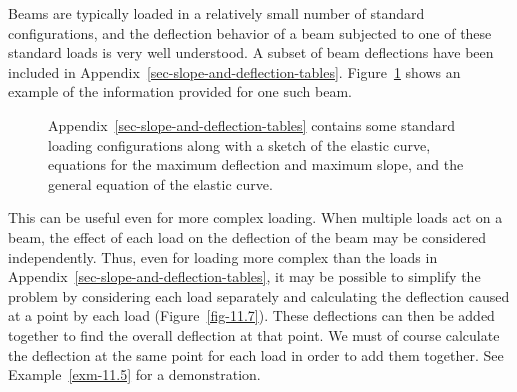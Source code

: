\documentclass[
  letterpaper,
  DIV=11,
  numbers=noendperiod]{scrreprt}
\theoremstyle{definition}
\theoremstyle{remark}
\begin{document}
Beams are typically loaded in a relatively small number of standard
configurations, and the deflection behavior of a beam subjected to one
of these standard loads is very well understood. A subset of beam
deflections have been included in
Appendix~\ref{sec-slope-and-deflection-tables}. Figure~\ref{fig-11.6}
shows an example of the information provided for one such beam.

\begin{figure}


\caption{\label{fig-11.6}Appendix~\ref{sec-slope-and-deflection-tables}
contains some standard loading configurations along with a sketch of the
elastic curve, equations for the maximum deflection and maximum slope,
and the general equation of the elastic curve.}

\end{figure}%

This can be useful even for more complex loading. When multiple loads
act on a beam, the effect of each load on the deflection of the beam may
be considered independently. Thus, even for loading more complex than
the loads in Appendix~\ref{sec-slope-and-deflection-tables}, it may be
possible to simplify the problem by considering each load separately and
calculating the deflection caused at a point by each load
(Figure~\ref{fig-11.7}). These deflections can then be added together to
find the overall deflection at that point. We must of course calculate
the deflection at the same point for each load in order to add them
together. See Example~\ref{exm-11.5} for a demonstration.
\end{document}
